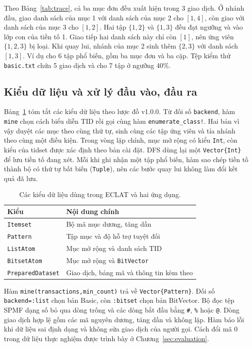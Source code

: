 Theo Bảng~\ref{tab:trace}, cả ba mục đơn đều xuất hiện trong 3 giao dịch.
Ở nhánh đầu, giao danh sách của mục 1 với danh sách của mục 2 cho
$[1,4]$, còn giao với danh sách của mục 3 cho $[1,2]$. Hai tập $\{1,2\}$
và $\{1,3\}$ đều đạt ngưỡng và vào lớp con của tiền tố 1. Giao tiếp hai
danh sách này chỉ còn $[1]$, nên ứng viên $\{1,2,3\}$ bị loại. Khi quay
lui, nhánh của mục 2 sinh thêm $\{2,3\}$ với danh sách $[1,3]$. Ví dụ cho
6 tập phổ biến, gồm ba mục đơn và ba cặp. Tệp kiểm thử \texttt{basic.txt}
chứa 5 giao dịch và cho 7 tập ở ngưỡng 40\%.

\subsection{Kiểu dữ liệu và xử lý đầu vào, đầu ra}
Bảng~\ref{tab:types} tóm tắt các kiểu dữ liệu theo lược đồ v1.0.0. Từ
đối số \texttt{backend}, hàm \texttt{mine} chọn cách biểu diễn TID rồi
gọi cùng hàm \texttt{enumerate\_class!}. Hai bản vì vậy duyệt các mục theo
cùng thứ tự, sinh cùng các tập ứng viên và tỉa nhánh theo cùng một
điều kiện. Trong vòng lặp chính, mục mở rộng có kiểu \texttt{Int}, còn
kiểu của tidset được xác định theo bản cài đặt. DFS dùng lại một
\texttt{Vector\{Int\}} để lưu tiền tố đang xét. Mỗi khi ghi nhận một tập
phổ biến, hàm sao chép tiền tố thành bộ có thứ tự bất biến (\texttt{Tuple}),
nên các bước quay lui không làm đổi kết quả đã lưu.

\begin{table}[tb]
\centering
\caption{Các kiểu dữ liệu dùng trong ECLAT và hai ứng dụng.}
\label{tab:types}
\begin{tabular}{ll}
\toprule
Kiểu & Nội dung chính \\
\midrule
\texttt{Itemset} & Bộ mã mục dương, tăng dần \\
\texttt{Pattern} & Tập mục và độ hỗ trợ tuyệt đối \\
\texttt{ListAtom} & Mục mở rộng và danh sách TID \\
\texttt{BitsetAtom} & Mục mở rộng và \texttt{BitVector} \\
\texttt{PreparedDataset} & Giao dịch, bảng mã và thông tin kèm theo \\
\bottomrule
\end{tabular}
\end{table}

Hàm \texttt{mine(transactions,min\_count)} trả về
\texttt{Vector\{Pattern\}}. Đối số \texttt{backend=:list} chọn bản Basic,
còn \texttt{:bitset} chọn bản BitVector. Bộ đọc tệp SPMF dạng số bỏ qua
dòng trống và các dòng bắt đầu bằng \texttt{\#}, \texttt{\%} hoặc
\texttt{@}. Dòng giao dịch hợp lệ gồm các mã nguyên dương, tăng dần và
không lặp. Hàm báo lỗi khi dữ liệu sai định dạng và không sửa giao dịch
của người gọi. Cách đổi mã 0 trong dữ liệu thực nghiệm được trình bày
ở Chương~\ref{sec:evaluation}.

